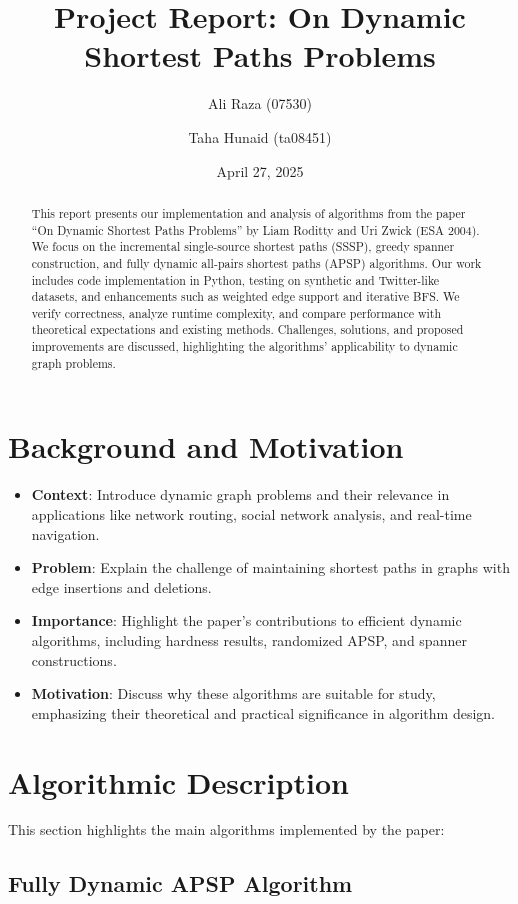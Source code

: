 \documentclass[11pt]{article}
\title{Project Report: On Dynamic Shortest Paths Problems}
\author{Ali Raza (07530) \and Taha Hunaid (ta08451)}
\date{April 27, 2025}
\begin{document}
\maketitle

\begin{abstract}
This report presents our implementation and analysis of algorithms from the paper ``On Dynamic Shortest Paths Problems'' by Liam Roditty and Uri Zwick (ESA 2004). We focus on the incremental single-source shortest paths (SSSP), greedy spanner construction, and fully dynamic all-pairs shortest paths (APSP) algorithms. Our work includes code implementation in Python, testing on synthetic and Twitter-like datasets, and enhancements such as weighted edge support and iterative BFS. We verify correctness, analyze runtime complexity, and compare performance with theoretical expectations and existing methods. Challenges, solutions, and proposed improvements are discussed, highlighting the algorithms' applicability to dynamic graph problems.
\end{abstract}

\section{Background and Motivation}
\begin{itemize}
    \item \textbf{Context}: Introduce dynamic graph problems and their relevance in applications like network routing, social network analysis, and real-time navigation.
    \item \textbf{Problem}: Explain the challenge of maintaining shortest paths in graphs with edge insertions and deletions.
    \item \textbf{Importance}: Highlight the paper's contributions to efficient dynamic algorithms, including hardness results, randomized APSP, and spanner constructions.
    \item \textbf{Motivation}: Discuss why these algorithms are suitable for study, emphasizing their theoretical and practical significance in algorithm design.
\end{itemize}

\section{Algorithmic Description}
This section highlights the main algorithms implemented by the paper:

\subsection*{Fully Dynamic APSP Algorithm}
\end{document}
